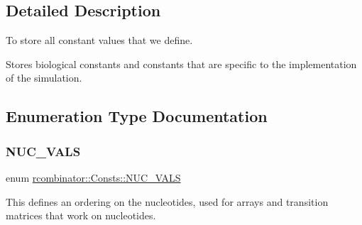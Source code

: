 \subsection{Detailed Description}
To store all constant values that we define. 

Stores biological constants and constants that are specific to the implementation of the simulation. 

\subsection{Enumeration Type Documentation}
\mbox{\label{namespacercombinator_1_1Consts_aaa096a23d1bc2fdb1992265192fae907}} 
\subsubsection{\texorpdfstring{N\+U\+C\+\_\+\+V\+A\+LS}{NUC\_VALS}}
{\footnotesize\ttfamily enum \mbox{\hyperlink{namespacercombinator_1_1Consts_aaa096a23d1bc2fdb1992265192fae907}{rcombinator\+::\+Consts\+::\+N\+U\+C\+\_\+\+V\+A\+LS}}}



This defines an ordering on the nucleotides, used for arrays and transition matrices that work on nucleotides. 

